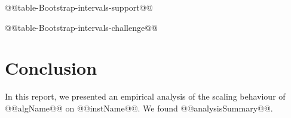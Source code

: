 \begin{table*}[tb]
\noindent \begin{centering}
@@table-Bootstrap-intervals-support@@
% 
\par\end{centering}

\caption{\label{tab:Bootstrap-intervals-support} 95\% bootstrap confidence intervals
for the @@statistic@@s of the  running time predictions and observed running times on @@instName@@. 
The instance sizes shown here are those used for fitting the models.
Bootstrap intervals on predictions that are weakly consistent
with the observed point estimates are shown in boldface 
and those that are strongly consistent are marked
by asterisks ({*}).}
\end{table*}

\begin{table*}[tb]
\noindent \begin{centering}
@@table-Bootstrap-intervals-challenge@@
% 
\par\end{centering}

\caption{\label{tab:Bootstrap-intervals-challenge} 95\% bootstrap confidence intervals
for the @@statistic@@s of the  running time predictions and observed running times on @@instName@@. 
The instance sizes shown here are larger than those used for fitting the models.
Bootstrap intervals on predictions that are weakly consistent
with the observed data are shown in boldface
and those that are strongly consistent are marked
by asterisks ({*}).}
\end{table*}


\section{Conclusion}

In this report, we presented an empirical analysis of the scaling
behaviour of @@algName@@ on @@instName@@. We found
@@analysisSummary@@.

